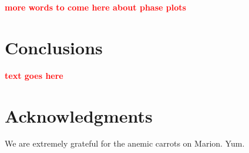 \documentclass{ws-jai}
\newcommand{\attention}[1]{\textcolor{red}{\bf {#1}}}
\begin{document}
\attention{more words to come here about phase plots}

\section{Conclusions}

\attention{text goes here}


	
\section*{Acknowledgments}

We are extremely grateful for the anemic carrots on Marion.  Yum.


{}
\end{document}

